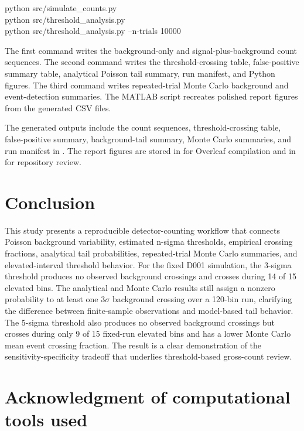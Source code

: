\documentclass[11pt,twocolumn]{article}
\begin{document}
\begin{flushleft}
\scriptsize\ttfamily
python src/simulate\_counts.py\\
python src/threshold\_analysis.py\\
python src/threshold\_analysis.py --n-trials 10000
\end{flushleft}

The first command writes the background-only and signal-plus-background count sequences. The second command writes the threshold-crossing table, false-positive summary table, analytical Poisson tail summary, run manifest, and Python figures. The third command writes repeated-trial Monte Carlo background and event-detection summaries. The MATLAB script  recreates polished report figures from the generated CSV files.

The generated outputs include the count sequences, threshold-crossing table, false-positive summary, background-tail summary, Monte Carlo summaries, and run manifest in . The report figures are stored in  for Overleaf compilation and in  for repository review.

\section{Conclusion}

This study presents a reproducible detector-counting workflow that connects Poisson background variability, estimated n-sigma thresholds, empirical crossing fractions, analytical tail probabilities, repeated-trial Monte Carlo summaries, and elevated-interval threshold behavior. For the fixed D001 simulation, the 3-sigma threshold produces no observed background crossings and crosses during 14 of 15 elevated bins. The analytical and Monte Carlo results still assign a nonzero probability to at least one \(3\sigma\) background crossing over a 120-bin run, clarifying the difference between finite-sample observations and model-based tail behavior. The 5-sigma threshold also produces no observed background crossings but crosses during only 9 of 15 fixed-run elevated bins and has a lower Monte Carlo mean event crossing fraction. The result is a clear demonstration of the sensitivity-specificity tradeoff that underlies threshold-based gross-count review.

\section*{Acknowledgment of computational tools used}
\end{document}
